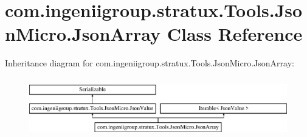 \hypertarget{classcom_1_1ingeniigroup_1_1stratux_1_1_tools_1_1_json_micro_1_1_json_array}{}\section{com.\+ingeniigroup.\+stratux.\+Tools.\+Json\+Micro.\+Json\+Array Class Reference}
\label{classcom_1_1ingeniigroup_1_1stratux_1_1_tools_1_1_json_micro_1_1_json_array}
Inheritance diagram for com.\+ingeniigroup.\+stratux.\+Tools.\+Json\+Micro.\+Json\+Array\+:\begin{figure}[H]
\begin{center}
\leavevmode
\includegraphics[height=2.625000cm]{classcom_1_1ingeniigroup_1_1stratux_1_1_tools_1_1_json_micro_1_1_json_array}
\end{center}
\end{figure}
